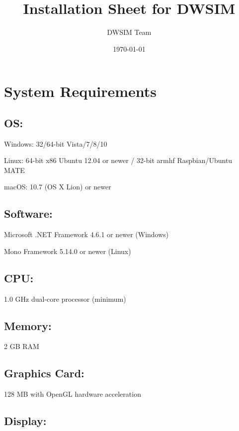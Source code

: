 \documentclass[12pt,a4paper]{article}
\begin{document}
\title{Installation Sheet for DWSIM}
\author{DWSIM Team}
\date{\today}

\maketitle

\section*{System Requirements}

\subsection*{OS:}

Windows: 32/64-bit Vista/7/8/10

\noindent Linux: 64-bit x86 Ubuntu 12.04 or newer / 32-bit armhf Raspbian/Ubuntu MATE

\noindent macOS: 10.7 (OS X Lion) or newer

\subsection*{Software:}

Microsoft .NET Framework 4.6.1 or newer (Windows) 

\noindent Mono Framework 5.14.0 or newer (Linux)

\subsection*{CPU:}
1.0 GHz dual-core processor (minimum)

\subsection*{Memory:}         

2 GB RAM

\subsection*{Graphics Card:}	

128 MB with OpenGL hardware acceleration

\subsection*{Display:}    
\end{document}
